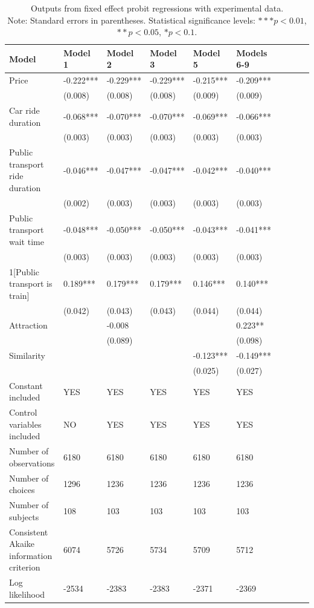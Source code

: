 \documentclass[a4paper,12pt]{article}
\begin{document}
\clearpage
\newpage
\clearpage
\begin{table}
    \centering
    \scriptsize
    \begin{tabular}{p{5.3cm}*{9}{p{1.5cm}}}
    \toprule
    Model & Model 1 & Model 2 & Model 3 & Model 5 & Models 6-9 \\
    \midrule
    Price & -0.222*** & -0.229*** & -0.229*** & -0.215*** & -0.209*** \\
     & (0.008) & (0.008) & (0.008) & (0.009) & (0.009) \\
    Car ride duration & -0.068*** & -0.070*** & -0.070*** & -0.069*** & -0.066*** \\
     & (0.003) & (0.003) & (0.003) & (0.003) & (0.003) \\
    Public transport ride duration & -0.046*** & -0.047*** & -0.047*** & -0.042*** & -0.040*** \\
     & (0.002) & (0.003) & (0.003) & (0.003) & (0.003) \\
    Public transport wait time & -0.048*** & -0.050*** & -0.050*** & -0.043*** & -0.041*** \\
     & (0.003) & (0.003) & (0.003) & (0.003) & (0.003) \\
    1[Public transport is train] & 0.189*** & 0.179*** & 0.179*** & 0.146*** & 0.140*** \\
     & (0.042) & (0.043) & (0.043) & (0.044) & (0.044) \\
    Attraction & & -0.008 & & & 0.223** \\
     & & (0.089) & & & (0.098) \\
    Similarity & & & & -0.123*** & -0.149*** \\
     & & & & (0.025) & (0.027) \\
    Constant included & YES & YES & YES & YES & YES \\
    Control variables included & NO & YES & YES & YES & YES \\
    Number of observations & 6180 & 6180 & 6180 & 6180 & 6180 \\
    Number of choices & 1296 & 1236 & 1236 & 1236 & 1236 \\
    Number of subjects & 108 & 103 & 103 & 103 & 103 \\
    Consistent Akaike information criterion & 6074 & 5726 & 5734 & 5709 & 5712 \\
    Log likelihood & -2534 & -2383 & -2383 & -2371 & -2369 \\

    \bottomrule
    \end{tabular}
    \caption{Outputs from fixed effect probit regressions with experimental data.\\ Note: Standard errors in parentheses. Statistical significance levels: $*** p<0.01$, $** p<0.05$, $* p<0.1$.}
    \label{tab:fixedProbitExperimentalData}
\end{table}
\clearpage
\newpage
\end{document}
